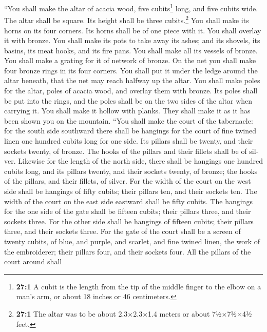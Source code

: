\begin{paracol}{2}
\begin{otherlanguage}{english}
 ``You shall make the altar of acacia wood, five
cubits\footnote{\textbf{27:1} A cubit is the length from the tip of the
  middle finger to the elbow on a man's arm, or about 18 inches or 46
  centimeters.} long, and five cubits wide. The altar shall be square.
Its height shall be three cubits.\footnote{\textbf{27:1} The altar was
  to be about 2.3×2.3×1.4 meters or about 7½×7½×4½ feet.} 
You shall make its horns on its four corners. Its horns shall be of one
piece with it. You shall overlay it with bronze.  You
shall make its pots to take away its ashes; and its shovels, its basins,
its meat hooks, and its fire pans. You shall make all its vessels of
bronze.  You shall make a grating for it of network of
bronze. On the net you shall make four bronze rings in its four corners.
 You shall put it under the ledge around the altar
beneath, that the net may reach halfway up the altar.  You
shall make poles for the altar, poles of acacia wood, and overlay them
with bronze.  Its poles shall be put into the rings, and
the poles shall be on the two sides of the altar when carrying it.
 You shall make it hollow with planks. They shall make it
as it has been shown you on the mountain.  ``You shall
make the court of the tabernacle: for the south side southward there
shall be hangings for the court of fine twined linen one hundred cubits
long for one side.  Its pillars shall be twenty, and
their sockets twenty, of bronze. The hooks of the pillars and their
fillets shall be of silver.  Likewise for the length of
the north side, there shall be hangings one hundred cubits long, and its
pillars twenty, and their sockets twenty, of bronze; the hooks of the
pillars, and their fillets, of silver.  For the width of
the court on the west side shall be hangings of fifty cubits; their
pillars ten, and their sockets ten.  The width of the
court on the east side eastward shall be fifty cubits. 
The hangings for the one side of the gate shall be fifteen cubits; their
pillars three, and their sockets three.  For the other
side shall be hangings of fifteen cubits; their pillars three, and their
sockets three.  For the gate of the court shall be a
screen of twenty cubits, of blue, and purple, and scarlet, and fine
twined linen, the work of the embroiderer; their pillars four, and their
sockets four.  All the pillars of the court around shall

\end{otherlanguage}
\end{paracol}
